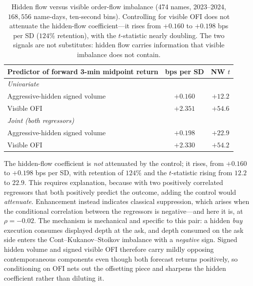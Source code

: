 \documentclass[11pt]{article}
\begin{document}
\begin{table}[htbp]
\centering
\begin{tabular}{lcc}
\toprule
\textbf{Predictor of forward 3-min midpoint return} & \textbf{bps per SD} & \textbf{NW $t$} \\
\midrule
\multicolumn{3}{l}{\emph{Univariate}} \\
\quad Aggressive-hidden signed volume & $+0.160$ & $+12.2$ \\
\quad Visible OFI \citep{cont2014} & $+2.351$ & $+54.6$ \\
\midrule
\multicolumn{3}{l}{\emph{Joint (both regressors)}} \\
\quad Aggressive-hidden signed volume & $+0.198$ & $+22.9$ \\
\quad Visible OFI & $+2.330$ & $+54.2$ \\
\bottomrule
\end{tabular}
\caption{Hidden flow versus visible order-flow imbalance (474 names, 2023--2024,
$168{,}556$ name-days, ten-second bins). Controlling for visible OFI does not attenuate
the hidden-flow coefficient---it rises from $+0.160$ to $+0.198$ bps per SD ($124\%$
retention), with the $t$-statistic nearly doubling. The two signals are not substitutes:
hidden flow carries information that visible imbalance does not contain.}
\label{tab:ofi}
\end{table}

The hidden-flow coefficient is \emph{not} attenuated by the control; it rises, from
$+0.160$ to $+0.198$ bps per SD, with retention of $124\%$ and the $t$-statistic rising
from $12.2$ to $22.9$. This requires explanation, because with two positively correlated
regressors that both positively predict the outcome, adding the control would
\emph{attenuate}. Enhancement instead indicates classical suppression, which arises when
the conditional correlation between the regressors is negative---and here it is, at
$\rho=-0.02$. The mechanism is mechanical and specific to this pair: a hidden \emph{buy}
execution consumes displayed depth at the ask, and depth consumed on the ask side enters
the Cont--Kukanov--Stoikov imbalance with a \emph{negative} sign. Signed hidden volume and
signed visible OFI therefore carry mildly opposing contemporaneous components even though
both forecast returns positively, so conditioning on OFI nets out the offsetting piece and
sharpens the hidden coefficient rather than diluting it.
\end{document}
